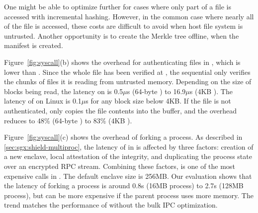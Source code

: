 One might be able to optimize further for cases where only part of a file is accessed
with incremental hashing.  However, in the common case where nearly all of the file is accessed,
these costs are difficult to avoid when host file system is untrusted.
Another opportunity 
is to create the Merkle tree offline, when the manifest is created.



Figure~\ref{fig:syscall}(b)
shows the overhead for authenticating files in , which 
is lower than .
Since the whole file has been verified at , the sequential  only verifies the chunks of files it is reading from untrusted memory.
Depending on the size of blocks being read, the latency on \graphenesgx{} is 0.5$\mu$s (64-byte ) to 16.9$\mu$s (4KB ). The latency of  on Linux is \roughly{}0.1$\mu$s for any block size below 4KB.
If the file is not authenticated,
\graphenesgx{} only copies the file contents into the buffer, and the overhead reduces to 48\% (64-byte ) to 83\% (4KB ).



Figure~\ref{fig:syscall}(c) shows the overhead of forking a process.
As described in \ref{sec:sgx:shield-multiproc}, the latency of  in \graphenesgx{} is affected by three factors:
creation of a new enclave, local attestation of the integrity, and duplicating the process state over an encrypted RPC stream.
Combining these factors,  is one of the most expensive calls in \graphenesgx{}.
The default enclave size is 256MB.
Our evaluation shows that the latency of forking a process is around 0.8s (16MB process) to 2.7s (128MB process), but can be more expensive if the parent process uses more memory.
The trend matches the performance of \graphene{} without the bulk IPC optimization.

